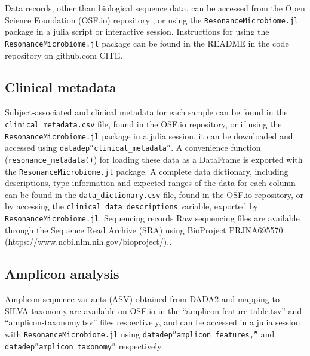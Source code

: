 \documentclass[fleqn,10pt]{wlscirep}
\begin{document}

Data records, other than biological sequence data, can be accessed from the Open Science Foundation (OSF.io) repository \cite{Bonham2021-zy},
or using the \verb|ResonanceMicrobiome.jl| package in a julia script or interactive session.
Instructions for using the \verb|ResonanceMicrobiome.jl| package can be found in the README in the code repository on github.com {{CITE}}.

\subsection*{Clinical metadata}

Subject-associated and clinical metadata for each sample can be found in the \verb|clinical_metadata.csv| file,
found in the OSF.io repository, or if using the \verb|ResonanceMicrobiome.jl| package in a julia session,
it can be downloaded and accessed using \verb|datadep”clinical_metadata”|.
A convenience function (\verb|resonance_metadata()|) for loading these data as a DataFrame
is exported with the \verb|ResonanceMicrobiome.jl| package.
A complete data dictionary, including descriptions, type information and expected ranges of the data for each column
can be found in the \verb|data_dictionary.csv| file, found in the OSF.io repository,
or by accessing the \verb|clinical_data_descriptions| variable, exported by \verb|ResonanceMicrobiome.jl|.
Sequencing records
Raw sequencing files are available through the Sequence Read Archive (SRA) using BioProject PRJNA695570 (https://www.ncbi.nlm.nih.gov/bioproject/)..

\subsection*{Amplicon analysis}

Amplicon sequence variants (ASV) obtained from DADA2 and mapping to SILVA taxonomy are available on OSF.io
in the “amplicon-feature-table.tsv” and “amplicon-taxonomy.tsv” files respectively,
and can be accessed in a julia session with \verb|ResonanceMicrobiome.jl| using \verb|datadep”amplicon_features,”|
and \verb|datadep”amplicon_taxonomy”| respectively.
\end{document}
